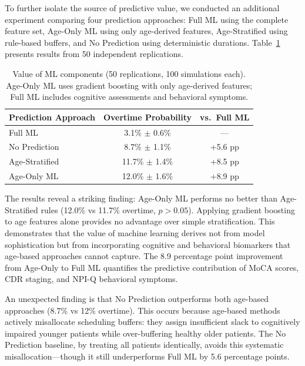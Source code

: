 To further isolate the source of predictive value, we conducted an additional experiment comparing four prediction approaches: Full ML using the complete feature set, Age-Only ML using only age-derived features, Age-Stratified using rule-based buffers, and No Prediction using deterministic durations. Table~\ref{tab:ml_value} presents results from 50 independent replications.

\begin{table}[htbp]
\centering
\caption{Value of ML components (50 replications, 100 simulations each). Age-Only ML uses gradient boosting with only age-derived features; Full ML includes cognitive assessments and behavioral symptoms.}
\label{tab:ml_value}
\begin{tabular}{@{}lcc@{}}
\toprule
\textbf{Prediction Approach} & \textbf{Overtime Probability} & \textbf{vs.\ Full ML} \\
\midrule
Full ML & 3.1\% $\pm$ 0.6\% & --- \\
No Prediction & 8.7\% $\pm$ 1.1\% & +5.6 pp \\
Age-Stratified & 11.7\% $\pm$ 1.4\% & +8.5 pp \\
Age-Only ML & 12.0\% $\pm$ 1.6\% & +8.9 pp \\
\bottomrule
\end{tabular}
\end{table}

The results reveal a striking finding: Age-Only ML performs no better than Age-Stratified rules (12.0\% vs 11.7\% overtime, $p > 0.05$). Applying gradient boosting to age features alone provides no advantage over simple stratification. This demonstrates that the value of machine learning derives not from model sophistication but from incorporating cognitive and behavioral biomarkers that age-based approaches cannot capture. The 8.9 percentage point improvement from Age-Only to Full ML quantifies the predictive contribution of MoCA scores, CDR staging, and NPI-Q behavioral symptoms.

An unexpected finding is that No Prediction outperforms both age-based approaches (8.7\% vs 12\% overtime). This occurs because age-based methods actively misallocate scheduling buffers: they assign insufficient slack to cognitively impaired younger patients while over-buffering healthy older patients. The No Prediction baseline, by treating all patients identically, avoids this systematic misallocation---though it still underperforms Full ML by 5.6 percentage points.

